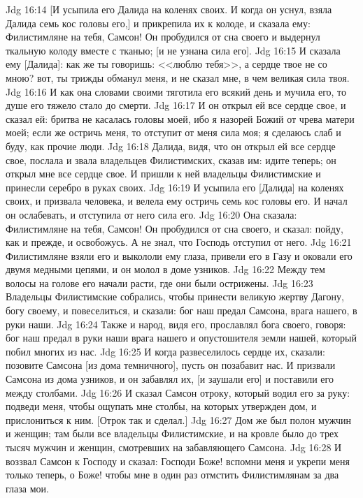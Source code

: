\vs Jdg 16:14 [И усыпила его Далида на коленях своих. И когда он уснул, взяла Далида семь кос головы его,] и прикрепила их к колоде, и сказала ему: Филистимляне  на тебя, Самсон! Он пробудился от сна своего и выдернул ткальную колоду вместе с тканью; [и не узнана сила его].
\vs Jdg 16:15 И сказала ему [Далида]: как же ты говоришь: <<люблю тебя>>, а сердце твое не со мною? вот, ты трижды обманул меня, и не сказал мне, в чем великая сила твоя.
\vs Jdg 16:16 И как она словами своими тяготила его всякий день и мучила его, то душе его тяжело стало до смерти.
\vs Jdg 16:17 И он открыл ей все сердце свое, и сказал ей: бритва не касалась головы моей, ибо я назорей Божий от чрева матери моей; если же остричь меня, то отступит от меня сила моя; я сделаюсь слаб и буду, как прочие люди.
\vs Jdg 16:18 Далида, видя, что он открыл ей все сердце свое, послала и звала владельцев Филистимских, сказав им: идите теперь; он открыл мне все сердце свое. И пришли к ней владельцы Филистимские и принесли серебро в руках своих.
\vs Jdg 16:19 И усыпила его [Далида] на коленях своих, и призвала человека, и велела ему остричь семь кос головы его. И начал он ослабевать, и отступила от него сила его.
\vs Jdg 16:20 Она сказала: Филистимляне  на тебя, Самсон! Он пробудился от сна своего, и сказал: пойду, как и прежде, и освобожусь. А не знал, что Господь отступил от него.
\vs Jdg 16:21 Филистимляне взяли его и выкололи ему глаза, привели его в Газу и оковали его двумя медными цепями, и он молол в доме узников.
\vs Jdg 16:22 Между тем волосы на голове его начали расти, где они были острижены.
\vs Jdg 16:23 Владельцы Филистимские собрались, чтобы принести великую жертву Дагону, богу своему, и повеселиться, и сказали: бог наш предал Самсона, врага нашего, в руки наши.
\vs Jdg 16:24 Также и народ, видя его, прославлял бога своего, говоря: бог наш предал в руки наши врага нашего и опустошителя земли нашей, который побил многих из нас.
\vs Jdg 16:25 И когда развеселилось сердце их, сказали: позовите Самсона [из дома темничного], пусть он позабавит нас. И призвали Самсона из дома узников, и он забавлял их, [и заушали его] и поставили его между столбами.
\vs Jdg 16:26 И сказал Самсон отроку, который водил его за руку: подведи меня, чтобы ощупать мне столбы, на которых утвержден дом, и прислониться к ним. [Отрок так и сделал.]
\vs Jdg 16:27 Дом же был полон мужчин и женщин; там были все владельцы Филистимские, и на кровле было до трех тысяч мужчин и женщин, смотревших на забавляющего  Самсона.
\vs Jdg 16:28 И воззвал Самсон к Господу и сказал: Господи Боже! вспомни меня и укрепи меня только теперь, о Боже! чтобы мне в один раз отмстить Филистимлянам за два глаза мои.
